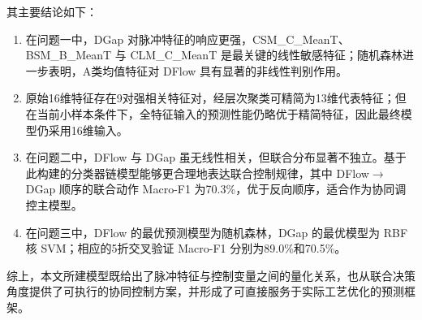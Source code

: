 \documentclass[UTF8,a4paper,12pt]{ctexart}
\begin{document}
其主要结论如下：
\begin{enumerate}[label=(\arabic*),leftmargin=2em]
\item 在问题一中，DGap 对脉冲特征的响应更强，CSM\_C\_MeanT、BSM\_B\_MeanT 与 CLM\_C\_MeanT 是最关键的线性敏感特征；随机森林进一步表明，A类均值特征对 DFlow 具有显著的非线性判别作用。
\item 原始16维特征存在9对强相关特征对，经层次聚类可精简为13维代表特征；但在当前小样本条件下，全特征输入的预测性能仍略优于精简特征，因此最终模型仍采用16维输入。
\item 在问题二中，DFlow 与 DGap 虽无线性相关，但联合分布显著不独立。基于此构建的分类器链模型能够更合理地表达联合控制规律，其中 DFlow$\rightarrow$DGap 顺序的联合动作 Macro-F1 为70.3\%，优于反向顺序，适合作为协同调控主模型。
\item 在问题三中，DFlow 的最优预测模型为随机森林，DGap 的最优模型为 RBF 核 SVM；相应的5折交叉验证 Macro-F1 分别为89.0\%和70.5\%。
\end{enumerate}

综上，本文所建模型既给出了脉冲特征与控制变量之间的量化关系，也从联合决策角度提供了可执行的协同控制方案，并形成了可直接服务于实际工艺优化的预测框架。
\end{document}
